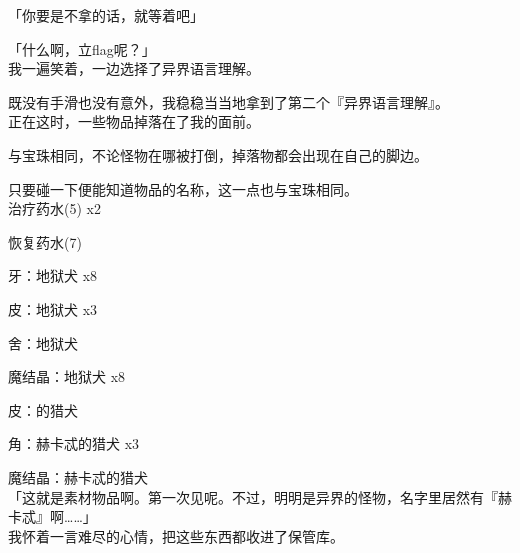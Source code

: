 「你要是不拿的话，就等着吧」

「什么啊，立flag呢？」\\

我一遍笑着，一边选择了异界语言理解。

既没有手滑也没有意外，我稳稳当当地拿到了第二个『异界语言理解』。\\

正在这时，一些物品掉落在了我的面前。

与宝珠相同，不论怪物在哪被打倒，掉落物都会出现在自己的脚边。

只要碰一下便能知道物品的名称，这一点也与宝珠相同。\\

治疗药水(5) x2

恢复药水(7)

牙：地狱犬 x8

皮：地狱犬 x3

舍：地狱犬

魔结晶：地狱犬 x8

皮：的猎犬

角：赫卡忒的猎犬 x3

魔结晶：赫卡忒的猎犬\\

「这就是素材物品啊。第一次见呢。不过，明明是异界的怪物，名字里居然有『赫卡忒』啊……」\\

我怀着一言难尽的心情，把这些东西都收进了保管库。\\
